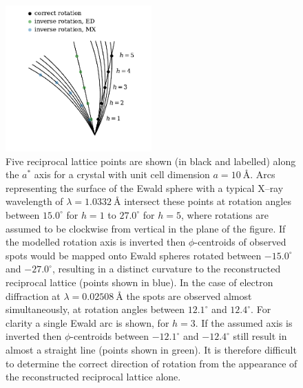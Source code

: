 \documentclass[preprint]{iucr}
\begin{document}
\begin{figure}
  \label{fig:invert_axis}
  \centering
  \caption{
    Five reciprocal lattice points are shown (in black and labelled) along the
    $a^*$ axis for a crystal with unit cell dimension $a=\SI{10}{\angstrom}$.
    Arcs representing the surface of the Ewald sphere with a typical X--ray
    wavelength of $\lambda=\SI{1.0332}{\angstrom}$ intersect these points at
    rotation angles between $15.0^\circ$ for $h=1$ to $27.0^\circ$ for $h=5$,
    where rotations are assumed to be clockwise from vertical in the plane of
    the figure. If the modelled rotation axis is inverted then $\phi$-centroids
    of observed spots would be mapped onto Ewald spheres rotated between
    $-15.0^\circ$ and $-27.0^\circ$, resulting in a distinct curvature to the
    reconstructed reciprocal lattice (points shown in blue). In the case of
    electron diffraction at $\lambda=\SI{0.02508}{\angstrom}$ the spots are
    observed almost simultaneously, at rotation angles between $12.1^\circ$ and
    $12.4^\circ$. For clarity a single Ewald arc is shown, for $h=3$. If the
    assumed axis is inverted then $\phi$-centroids between $-12.1^\circ$ and
    $-12.4^\circ$ still result in almost a straight line (points shown in
    green). It is therefore difficult to determine the correct direction of
    rotation from the appearance of the reconstructed reciprocal lattice alone.
  }
  \includegraphics[width=0.5\textwidth]{Figures/relps_inverted_axis.pdf}
\end{figure}
\end{document}
